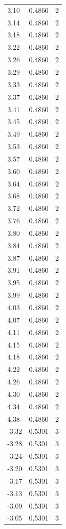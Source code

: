 \begin{longtable}{lrr}
  3.10 & 0.4860 & 2 \\
  3.14 & 0.4860 & 2 \\
  3.18 & 0.4860 & 2 \\
  3.22 & 0.4860 & 2 \\
  3.26 & 0.4860 & 2 \\
  3.29 & 0.4860 & 2 \\
  3.33 & 0.4860 & 2 \\
  3.37 & 0.4860 & 2 \\
  3.41 & 0.4860 & 2 \\
  3.45 & 0.4860 & 2 \\
  3.49 & 0.4860 & 2 \\
  3.53 & 0.4860 & 2 \\
  3.57 & 0.4860 & 2 \\
  3.60 & 0.4860 & 2 \\
  3.64 & 0.4860 & 2 \\
  3.68 & 0.4860 & 2 \\
  3.72 & 0.4860 & 2 \\
  3.76 & 0.4860 & 2 \\
  3.80 & 0.4860 & 2 \\
  3.84 & 0.4860 & 2 \\
  3.87 & 0.4860 & 2 \\
  3.91 & 0.4860 & 2 \\
  3.95 & 0.4860 & 2 \\
  3.99 & 0.4860 & 2 \\
  4.03 & 0.4860 & 2 \\
  4.07 & 0.4860 & 2 \\
  4.11 & 0.4860 & 2 \\
  4.15 & 0.4860 & 2 \\
  4.18 & 0.4860 & 2 \\
  4.22 & 0.4860 & 2 \\
  4.26 & 0.4860 & 2 \\
  4.30 & 0.4860 & 2 \\
  4.34 & 0.4860 & 2 \\
  4.38 & 0.4860 & 2 \\
  -3.32 & 0.5301 & 3 \\
  -3.28 & 0.5301 & 3 \\
  -3.24 & 0.5301 & 3 \\
  -3.20 & 0.5301 & 3 \\
  -3.17 & 0.5301 & 3 \\
  -3.13 & 0.5301 & 3 \\
  -3.09 & 0.5301 & 3 \\
  -3.05 & 0.5301 & 3 \\

\end{longtable}
